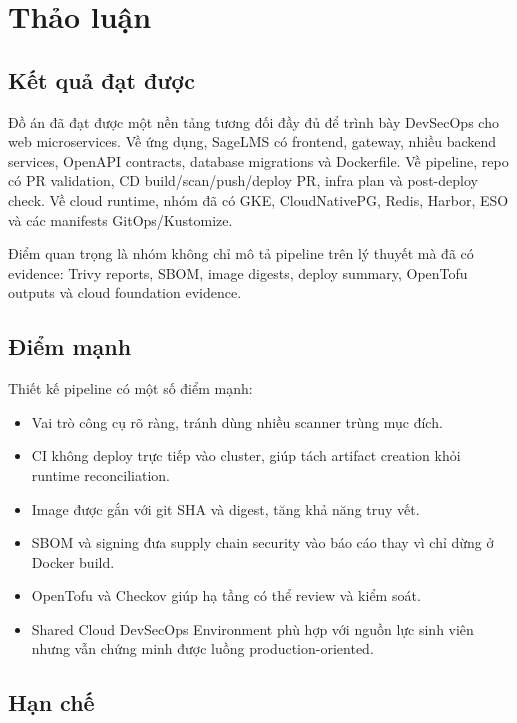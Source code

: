 \chapter{Thảo luận}
\label{chap:discussion}

\section{Kết quả đạt được}

Đồ án đã đạt được một nền tảng tương đối đầy đủ để trình bày DevSecOps cho web microservices. Về ứng dụng, SageLMS có frontend, gateway, nhiều backend services, OpenAPI contracts, database migrations và Dockerfile. Về pipeline, repo có PR validation, CD build/scan/push/deploy PR, infra plan và post-deploy check. Về cloud runtime, nhóm đã có GKE, CloudNativePG, Redis, Harbor, ESO và các manifests GitOps/Kustomize.

Điểm quan trọng là nhóm không chỉ mô tả pipeline trên lý thuyết mà đã có evidence: Trivy reports, SBOM, image digests, deploy summary, OpenTofu outputs và cloud foundation evidence.

\section{Điểm mạnh}

Thiết kế pipeline có một số điểm mạnh:

\begin{itemize}
  \item Vai trò công cụ rõ ràng, tránh dùng nhiều scanner trùng mục đích.
  \item CI không deploy trực tiếp vào cluster, giúp tách artifact creation khỏi runtime reconciliation.
  \item Image được gắn với git SHA và digest, tăng khả năng truy vết.
  \item SBOM và signing đưa supply chain security vào báo cáo thay vì chỉ dừng ở Docker build.
  \item OpenTofu và Checkov giúp hạ tầng có thể review và kiểm soát.
  \item Shared Cloud DevSecOps Environment phù hợp với nguồn lực sinh viên nhưng vẫn chứng minh được luồng production-oriented.
\end{itemize}

\section{Hạn chế}

